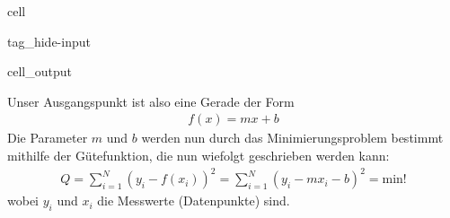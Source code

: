\documentclass[letterpaper,10pt,english]{jupyterBook}
\begin{document}
\begin{sphinxuseclass}{cell}
\begin{sphinxuseclass}{tag_hide-input}\begin{sphinxVerbatimOutput}

\begin{sphinxuseclass}{cell_output}
\noindent{}

\end{sphinxuseclass}\end{sphinxVerbatimOutput}

\end{sphinxuseclass}
\end{sphinxuseclass}
\sphinxAtStartPar
Unser Ausgangspunkt ist also eine Gerade der Form
\begin{equation*}
\begin{split}f(x) = mx + b\end{split}
\end{equation*}
\sphinxAtStartPar
Die Parameter \(m\) und \(b\) werden nun durch das Minimierungsproblem bestimmt mithilfe der Gütefunktion, die nun wiefolgt geschrieben werden kann:
\begin{equation*}
\begin{split}Q = \sum_{i = 1}^{N} (y_i - f(x_i))^2 = \sum_{i = 1}^{N} (y_i - mx_i - b)^2 = \mathrm{min!}\end{split}
\end{equation*}
\sphinxAtStartPar
wobei \(y_i\) und \(x_i\) die Messwerte (Datenpunkte) sind.
\end{document}
